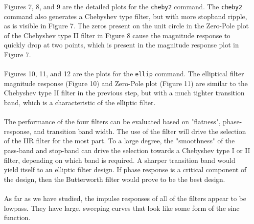 \documentclass{article}
\begin{document}
\begin{par}
Figures 7, 8, and 9 are the detailed plots for the \texttt{cheby2} command.  The \texttt{cheby2} command also generates a Chebyshev type filter, but with more stopband ripple, as is visible in Figure 7.  The zeros present on the unit circle in the Zero-Pole plot of the Chebyshev type II filter in Figure 8 cause the magnitude response to quickly drop at two points, which is present in the magnitude response plot in Figure 7.\\
\\
Figures 10, 11, and 12 are the plots for the \texttt{ellip} command.  The elliptical filter magnitude response (Figure 10) and Zero-Pole plot (Figure 11) are similar to the Chebyshev type II filter in the previous step, but with a much tighter transition band, which is a characteristic of the elliptic filter.\\
\\
The performance of the four filters can be evaluated based on "flatness", phase-response, and transition band width.  The use of the filter will drive the selection of the IIR filter for the most part.  To a large degree, the "smoothness" of the pass-band and stop-band can drive the selection towards a Chebyshev type I or II filter, depending on which band is required.  A sharper transition band would yield itself to an elliptic filter design.  If phase response is a critical component of the design, then the Butterworth filter would prove to be the best design.\\
\\
As far as we have studied, the impulse responses of all of the filters appear to be lowpass.  They have large, sweeping curves that look like some form of the sinc function.
\end{par}
\end{document}
